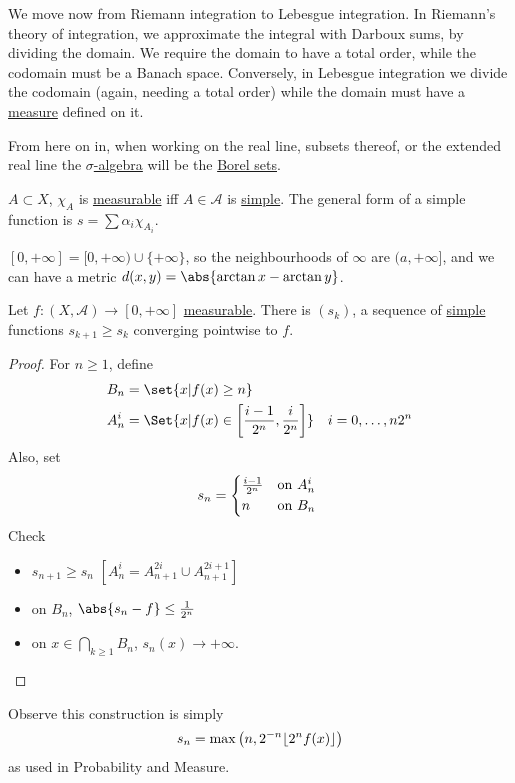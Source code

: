 \documentclass[twoside]{article}
\DeclarePairedDelimiter{\floor}{\lfloor}{\rfloor}
\begin{document}
We move now from Riemann integration to Lebesgue integration.
In Riemann's theory of integration, we approximate the integral with Darboux sums, by dividing the domain. We require the domain to have a total order, while the codomain must be a Banach space.
Conversely, in Lebesgue integration we divide the codomain (again, needing a total order) while the domain must have a \hyperlink{def:measure}{measure} defined on it.
\begin{defi}[Simple]\hypertarget{def:simple}
    $f: (X, \mathscr{A}) \to (\R, \mathcal{B}(R))$ is \textbf{simple} if it is \hyperlink{def:measure}{measurable} and takes a finite number of values in $[0, +\infty)$.
\end{defi}
From here on in, when working on the real line, subsets thereof, or the extended real line the \hyperlink{def:sigAlg}{$\sigma$-algebra} will be the \hyperlink{def:borelSet}{Borel sets}.
\begin{remark}
    $A \subset X$, $\chi_A$ is \hyperlink{def:measFunc}{measurable} iff $A \in \mathscr{A}$ is \hyperlink{def:simple}{simple}.
    The general form of a simple function is $s = \sum \alpha_i \chi_{A_i}$.
\end{remark}
\begin{notation}
    $[0, +\infty] = [0, +\infty) \cup \{+\infty\}$, so the neighbourhoods of $\infty$ are $(a, +\infty]$, and we can have a metric $d(x,y) = \abs{\arctan x - \arctan y}$.
\end{notation}
\begin{prop}
    Let $f: (X, \mathscr{A}) \to [0, +\infty]$ \hyperlink{def:measFunc}{measurable}.
    There is $(s_k)$, a sequence of \hyperlink{def:simple}{simple} functions $s_{k+1} \geq s_k$ converging pointwise to $f$.
\end{prop}
\begin{proof}
    For $n \geq 1$, define
    \begin{align*}
        B_n &= \set{x | f(x) \geq n}  \\
        A_n^i &= \Set{x | f(x) \in \left[\frac{i-1}{2^n}, \frac{i}{2^n}\right]} \quad i=0, \dotsc, n 2^n
    \end{align*}
    Also, set
    \begin{equation*}
    s_n = \begin{cases*}\frac{i-1}{2^n} & on $A_n^i$ \\ n & on $B_n$\end{cases*}
    \end{equation*}
    Check
    \begin{itemize}
        \item $s_{n+1} \geq s_n$ $[A_n^i = A_{n+1}^{2i} \cup A_{n+1}^{2i+1}]$
        \item on $B_n$, $\abs{s_n - f} \leq \frac{1}{2^n}$
        \item on $x \in \bigcap_{k \geq 1} B_n$, $s_n(x) \to +\infty$.\qedhere
    \end{itemize}
\end{proof}
Observe this construction is simply
\begin{equation*}
    s_n = \max\left(n, 2^{-n} \floor*{2^{n} f(x)}\right)
\end{equation*}
as used in Probability and Measure.
\end{document}
